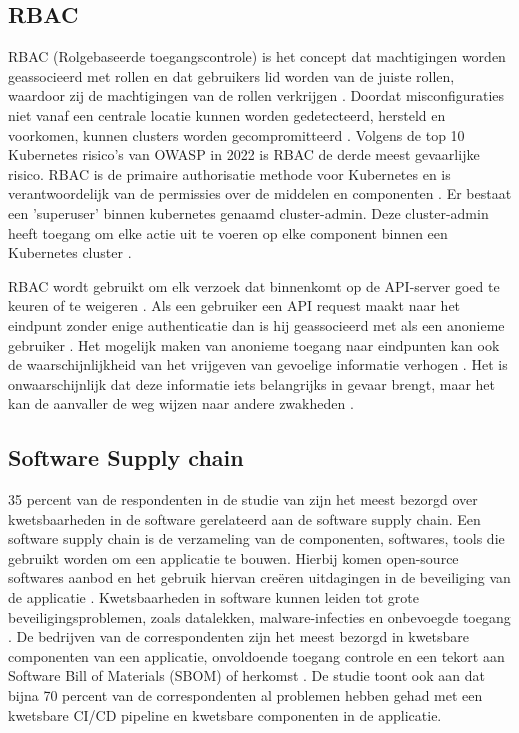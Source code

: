 \subsection{RBAC}
RBAC (Rolgebaseerde toegangscontrole) is het concept dat machtigingen worden geassocieerd met rollen en dat gebruikers lid worden van de juiste rollen, waardoor zij de machtigingen van de rollen verkrijgen \autocite{Sandhu1998}. Doordat misconfiguraties niet vanaf een centrale locatie kunnen worden gedetecteerd, hersteld en voorkomen, kunnen clusters worden gecompromitteerd \autocite{OWASP-2023}. Volgens de top 10 Kubernetes risico's van OWASP in 2022 is RBAC de derde meest gevaarlijke risico. RBAC is de primaire authorisatie methode voor Kubernetes en is verantwoordelijk van de permissies over de middelen en componenten \autocite{OWASP-2023}. Er bestaat een 'superuser' binnen kubernetes genaamd cluster-admin. Deze cluster-admin heeft toegang om elke actie uit te voeren op elke component binnen een Kubernetes cluster \autocite{OWASP-2023}. 

RBAC wordt gebruikt om elk verzoek dat binnenkomt op de API-server goed te keuren of te weigeren \autocite{mytilinakis2020attack}. Als een gebruiker een API request maakt naar het eindpunt zonder enige authenticatie dan is hij geassocieerd met als een anonieme gebruiker \autocite{mytilinakis2020attack}. Het mogelijk maken van anonieme toegang naar eindpunten kan ook de waarschijnlijkheid van het vrijgeven van gevoelige informatie verhogen \autocite{Rice2018}. Het is onwaarschijnlijk dat deze informatie iets belangrijks in gevaar brengt, maar het kan de aanvaller de weg wijzen naar andere zwakheden \autocite{Rice2018}.

\subsection{Software Supply chain}
35 percent van de respondenten in de studie van \textcite{red-hat-2023} zijn het meest bezorgd over kwetsbaarheden in de software gerelateerd aan de software supply chain. Een software supply chain is de verzameling van de componenten, softwares, tools die gebruikt worden om een applicatie te bouwen. Hierbij komen open-source softwares aanbod en het gebruik hiervan creëren uitdagingen in de beveiliging van de applicatie \autocite{red-hat-2023}. Kwetsbaarheden in software kunnen leiden tot grote beveiligingsproblemen, zoals datalekken, malware-infecties en onbevoegde toegang \autocite{shamim2020xi}. De bedrijven van de correspondenten zijn het meest bezorgd in kwetsbare componenten van een applicatie, onvoldoende toegang controle en een tekort aan Software Bill of Materials (SBOM) of herkomst \autocite{red-hat-2023}. De studie toont ook aan dat bijna 70 percent van de correspondenten al problemen hebben gehad met een kwetsbare CI/CD pipeline en kwetsbare componenten in de applicatie. \newline

